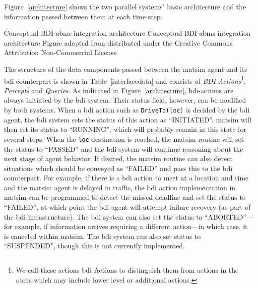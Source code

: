 Figure~\ref{architecture} shows the two parallel systems' basic architecture 
and the information passed between them
at each time step.

%

\createfigure%
{Conceptual BDI-\gls{abms} integration architecture}%
{Conceptual BDI-\gls{abms} integration architecture}%
{\label{architecture}}%
{\resizebox{0.75\textwidth}{!}{}}%
{Figure adapted from \citet[][Figure~1]{ecai} distributed under the Creative Commons Attribution Non-Commercial License}

The structure of the data components passed between the \gls{matsim} agent
and its \gls{bdi} counterpart is shown in Table~\ref{interfacedata} and
consists of {\it BDI Actions}\footnote{We call these actions \gls{bdi}
  Actions to distinguish them from actions in the \gls{abms} which may
  include lower level or additional actions.}, {\it Percepts} and {\it
  Queries}. As indicated in Figure~\ref{architecture}, \gls{bdi}-actions are
always initiated by the \gls{bdi} system. Their status field, however, can be
modified by both systems.  When a \gls{bdi} action such as
\lstinline{DriveTo(loc)} is decided by the \gls{bdi} agent, the \gls{bdi} system
sets the status of this action as ``INITIATED''. \gls{matsim} will then
set its status to ``RUNNING'', which will probably remain in this state for
several steps. When the \lstinline{loc} destination is reached,
the \gls{matsim} routine will set the status to ``PASSED'' and the \gls{bdi}
system will continue reasoning about the next stage of agent
behavior. If desired, the \gls{matsim} routine can also detect situations
which should be conveyed as ``FAILED'' and pass this to the \gls{bdi}
counterpart. For example, if there is a \gls{bdi} action to meet at a
location and time and the \gls{matsim} agent is delayed in traffic, the \gls{bdi}
action implementation in \gls{matsim} can be programmed to detect the
missed deadline and set the status to ``FAILED'', at which
point the \gls{bdi} agent will attempt failure recovery (as part of the \gls{bdi}
infrastructure). The \gls{bdi} system can also set the status to 
``ABORTED''---for example, if information arrives requiring a different
action---in which case, it is canceled within \gls{matsim}. The \gls{bdi} system
can also set status to ``SUSPENDED'', though this is not currently
implemented.

